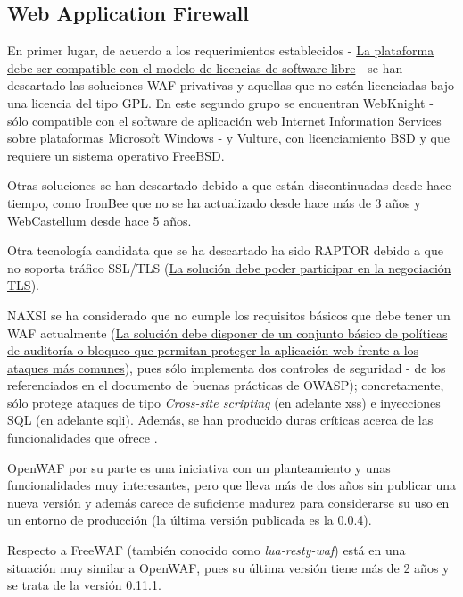 \subsection{Web Application Firewall}
\par En primer lugar, de acuerdo a los requerimientos establecidos - {\hyperref[req:softwarelibre]{La plataforma debe ser compatible con el modelo de
licencias de software libre}} - se han descartado las soluciones WAF privativas y aquellas que no estén licenciadas bajo una licencia del tipo GPL.  En
este segundo grupo se encuentran WebKnight - sólo compatible con el software de aplicación web Internet Information Services\cite{iis} sobre plataformas
Microsoft Windows - y Vulture, con licenciamiento BSD y que requiere un sistema operativo FreeBSD.

\par Otras soluciones se han descartado debido a que están discontinuadas desde hace tiempo, como IronBee que no se ha actualizado desde hace más de 3 años
y WebCastellum desde hace 5 años.

\par Otra tecnología candidata que se ha descartado ha sido RAPTOR debido a que no soporta tráfico SSL/TLS ({\hyperref[req:tls]{La solución debe poder
participar en la negociación TLS}}).

\par NAXSI se ha considerado que no cumple los requisitos básicos que debe tener un WAF actualmente ({\hyperref[req:commonattacks]{La solución debe
disponer de un conjunto básico de políticas de auditoría o bloqueo que permitan proteger la aplicación web frente a los ataques más comunes}}), pues
sólo implementa dos controles de seguridad - de los referenciados en el documento de buenas prácticas de OWASP\cite[apartado A3.2]{owaspbestpractices});
concretamente, sólo protege ataques de tipo {\em Cross-site scripting} (en adelante \acrshort{xss}\cite{owaspxss}) e inyecciones SQL (en adelante
\acrshort{sqli}\cite{owaspsqli}). Además, se han producido duras críticas acerca de las funcionalidades que ofrece \cite{naxsianalisis}.

\par OpenWAF por su parte es una iniciativa con un planteamiento y unas funcionalidades muy interesantes, pero que lleva más de dos años sin
publicar una nueva versión y además carece de suficiente madurez para considerarse su uso en un entorno de producción (la última versión
publicada es la 0.0.4).

\par Respecto a FreeWAF (también conocido como {\em lua-resty-waf}) está en una situación muy similar a OpenWAF, pues su última versión tiene más de 2
años y se trata de la versión 0.11.1\cite{freewafchangelog}.

